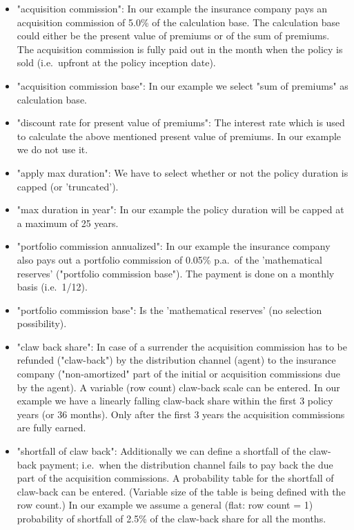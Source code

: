 \begin{itemize}
	\item "acquisition commission": In our example the insurance company pays an acquisition commission of 5.0\% of the calculation base. The calculation base could either be the present value of premiums or of the sum of premiums. The acquisition commission is fully paid out in the month when the policy is sold (i.e.~upfront at the policy inception date).
\item "acquisition commission base": In our example we select "sum of premiums" as calculation base.
\item "discount rate for present value of premiums": The interest rate which is used to calculate the above mentioned present value of premiums. In our example we do not use it.
\item "apply max duration": We have to select whether or not the policy duration is capped (or 'truncated').
\item "max duration in year": In our example the policy duration will be capped at a maximum of 25 years.
\item "portfolio commission annualized": In our example the insurance company also pays out a portfolio commission of 0.05\% p.a.~of the 'mathematical reserves' ("portfolio commission base"). The payment is done on a monthly basis (i.e.~1/12).
\item "portfolio commission base": Is the 'mathematical reserves' (no selection possibility).
\item "claw back share": In case of a surrender the acquisition commission has to be refunded ("claw-back") by the distribution channel (agent) to the insurance company ("non-amortized" part of the initial or acquisition commissions due by the agent). A variable (row count) claw-back scale can be entered. In our example we have a linearly falling claw-back share within the first 3 policy years (or 36 months). Only after the first 3 years the acquisition commissions are fully earned.
\item "shortfall of claw back": Additionally we can define a shortfall of the claw-back payment; i.e.~when the distribution channel fails to pay back the due part of the acquisition commissions. A probability table for the shortfall of claw-back can be entered. (Variable size of the table is being defined with the row count.) In our example we assume a general (flat: row count = 1) probability of shortfall of 2.5\% of the claw-back share for all the months.
\end{itemize}

